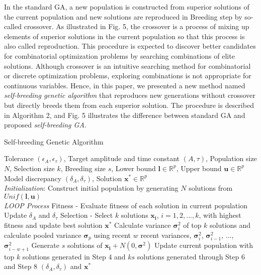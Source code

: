 \documentclass[journal]{IEEEtran}
\begin{document}
In the standard GA, a new population is constructed from superior solutions of the current population and new solutions are reproduced in Breeding step by so-called crossover. As illustrated in Fig. 5, the crossover is a process of mixing up elements of superior solutions in the current population so that this process is also called reproduction. This procedure is expected to discover better candidates for combinatorial optimization problems by searching combinations of elite solutions. Although crossover is an intuitive searching method for combinatorial or discrete optimization problems, exploring combinations is not appropriate for continuous variables. Hence, in this paper, we presented a new method named \textit{self-breeding genetic algorithm} that reproduces new generations without crossover but directly breeds them from each superior solution. The procedure is described in Algorithm 2, and Fig. 5 illustrates the difference between standard GA and proposed \textit{self-breeding GA}.
\begin{algorithm}
    \caption{Self-breeding Genetic Algorithm}
    \begin{algorithmic}[1-=0+-*]
        \renewcommand{\algorithmicrequire}{\textbf{Input:}}
        \renewcommand{\algorithmicensure}{\textbf{Output:}}
        \REQUIRE Tolerance $(\epsilon_{A}, \epsilon_{\tau})$, Target amplitude and time constant $(A, \tau)$, Population size $N$, Selection size $k$, Breeding size $s$, Lower bound $\mathbf{l} \in \mathbb{R}^p$, Upper bound $\mathbf{u} \in \mathbb{R}^p$
        \ENSURE Model discrepancy $(\delta_{A}, \delta_{\tau})$, Solution $\mathbf{x}^* \in \mathbb{R}^p$
        \\ \textit{Initialization}:
        \STATE Construct initial population by generating $N$ solutions from $Unif(\mathbf{l}, \mathbf{u})$
        \\ \textit{LOOP Process}
        \STATE Fitness - Evaluate fitness of each solution in current population        
        \STATE Update $\delta_{A}$ and $\delta_{\tau}$
        \STATE Selection - Select $k$ solutions $\mathbf{x_i}$, $i=1,2,...,k$, with highest fitness and update best solution $\mathbf{x^{*}}$
        \STATE Calculate variance $\mathbf{\sigma}^2_{i}$ of top $k$ solutions and calculate pooled variance $\mathbf{\sigma}_{p}$ using recent $w$ recent variances, $\mathbf{\sigma}^2_{i}$, $\mathbf{\sigma}^2_{i-1}$, ..., $\mathbf{\sigma}^2_{i-w+1}$
            \STATE Generate $s$ solutions of $\mathbf{x_i} + N(0,\mathbf{\sigma}^2)$
        \ENDFOR
        \STATE Update current population with top $k$ solutions generated in Step 4 and $ks$ solutions generated through Step 6 and Step 8
        \ENDWHILE
        \RETURN $(\delta_{A}, \delta_{\tau})$ and $\mathbf{x}^*$
    \end{algorithmic} 
\end{algorithm}
\end{document}
